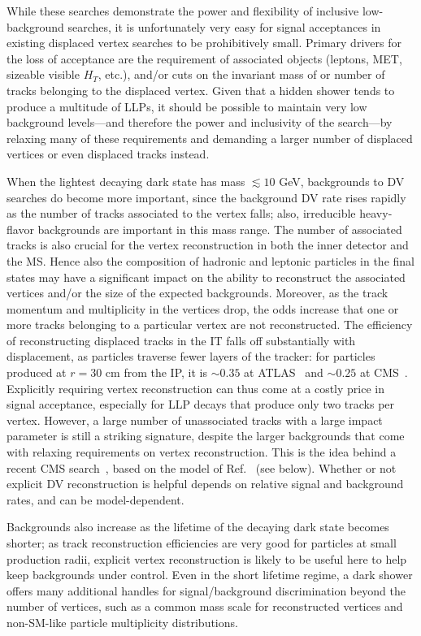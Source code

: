 While these searches demonstrate the power and flexibility of inclusive low-background searches, it is unfortunately very easy for signal acceptances in  existing displaced vertex searches to be prohibitively small.  Primary drivers for the loss of acceptance are the requirement of associated objects (leptons, MET, sizeable visible $H_T$, etc.), and/or cuts on the invariant mass of or number of tracks belonging to the displaced vertex. Given that a hidden shower tends to produce a multitude of LLPs, it should be possible to maintain very low background levels---and therefore the power and inclusivity of the search---by relaxing many of these requirements and demanding a larger number of displaced vertices or even displaced tracks instead.  

When the lightest decaying dark state has mass $\lesssim 10$ GeV, backgrounds to DV searches do become more important,  since the background DV rate rises rapidly as the number of tracks associated to the vertex falls; also, irreducible heavy-flavor backgrounds are important in this mass range. The number of associated tracks is also crucial for the vertex reconstruction in both the inner detector and the MS. Hence also the composition of hadronic and leptonic particles in the final states may have a significant impact on the ability to reconstruct the associated vertices and/or the size of the expected backgrounds. Moreover, as the track momentum and multiplicity in the vertices drop, the odds increase that one or more tracks belonging to a particular vertex are not reconstructed. 
The efficiency of reconstructing displaced tracks in the IT falls off substantially with displacement, as particles traverse fewer layers of the tracker: for particles produced at $r=30$ cm  from the IP, it is $\sim 0.35$ at ATLAS~\cite{ATL-PHYS-PUB-2017-014} and $\sim 0.25$ at CMS~\cite{Rovere:2134627}.  Explicitly requiring vertex reconstruction can thus come at a costly price in signal acceptance, especially for LLP decays that produce only two tracks per vertex. However, a large number of unassociated tracks with a large impact parameter is still a striking signature, despite the larger backgrounds that come with relaxing requirements on vertex reconstruction.   This is the idea behind a recent CMS search~\cite{CMS-PAS-EXO-18-001}, based on the model of Ref.~\cite{Schwaller:2015gea} (see below).  Whether or not explicit DV reconstruction is helpful depends on relative signal and background rates, and can be model-dependent.  

Backgrounds also increase as the lifetime of the decaying dark state becomes shorter; as track reconstruction efficiencies are very good for particles at small production radii, explicit vertex reconstruction is likely to be useful here to help keep backgrounds under control.  Even in the short lifetime regime, a dark shower offers many additional handles for signal/background discrimination beyond the number of vertices, such as a common mass scale for reconstructed vertices and non-SM-like particle multiplicity distributions.


